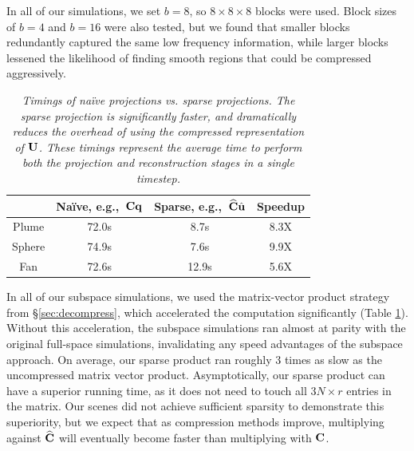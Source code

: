 In all of our simulations, we set $b = 8$, so $8 \times 8 \times 8$ blocks were used. Block sizes of $b = 4$ and $b = 16$ were also tested, but we found that smaller blocks redundantly captured the same low frequency information, while larger blocks lessened the likelihood of finding smooth regions that could be compressed aggressively. 
\begin{table}
\begin{center}
\begin{tabular}{|c||c|c|c|} \hline
 & Na\"{i}ve, e.g.,~$\mathbf{C}\mathbf{q}$ & Sparse, e.g.,~$\widehat{\mathbf{C}}\hat{\mathbf{u}}$ & Speedup\\
\hline
Plume & 72.0s & 8.7s & 8.3X\\
\hline
Sphere & 74.9s & 7.6s & 9.9X \\
\hline
Fan & 72.6s & 12.9s & 5.6X \\
\hline
\end{tabular}
\end{center}
\caption{\label{tab:naive-vs-sparse}{\em Timings of na\"{i}ve projections vs. sparse projections. The sparse projection is significantly faster, and dramatically reduces the overhead of using the compressed representation of $\mathbf{U}$. These timings represent the average time to perform {\em both} the projection and reconstruction stages in a single timestep.}}
\end{table}

In all of our subspace simulations, we used the matrix-vector product strategy from \S\ref{sec:decompress}, which accelerated the computation significantly (Table \ref{tab:naive-vs-sparse}). Without this acceleration, the subspace simulations ran almost at parity with the original full-space simulations, invalidating any speed advantages of the subspace approach. On average, our sparse product ran roughly 3 times as slow as the uncompressed matrix vector product. Asymptotically, our sparse product can have a superior running time, as it does not need to touch all $3N \times r$ entries in the matrix. Our scenes did not achieve sufficient sparsity to demonstrate this superiority, but we expect that as compression methods improve, multiplying against $\widehat{\mathbf{C}}$ will eventually become faster than multiplying with $\mathbf{C}$.

